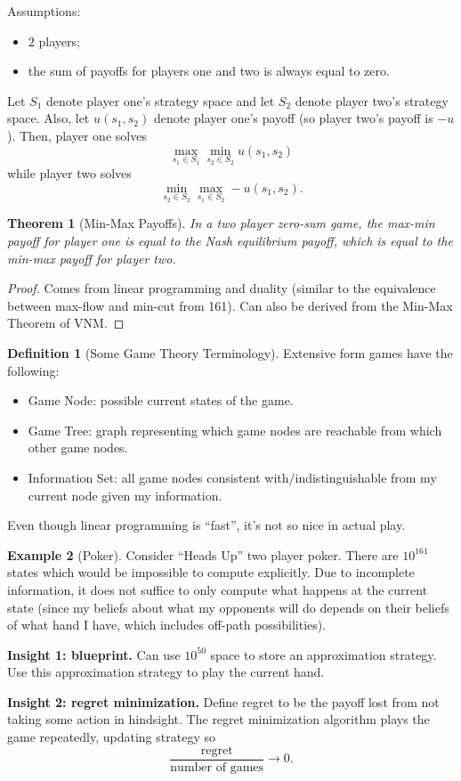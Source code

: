 \documentclass[dvipsnames]{article}
\newtheorem{theorem}{Theorem}[section]
\theoremstyle{definition}
\newtheorem{definition}{Definition}[section]
\newtheorem{example}[definition]{Example}
\theoremstyle{remark}
\begin{document}
Assumptions:
\begin{itemize}
	\item $2$ players; 
	\item the sum of payoffs for players one and two is always equal to zero.
\end{itemize}

Let $S_1$ denote player one's strategy space and let $S_2$ denote player two's strategy space. Also, let $u(s_1,s_2)$ denote player one's payoff (so player two's payoff is $-u$). Then, player one solves
$$\max_{s_1 \in S_1} \min_{s_2 \in S_2} u(s_1,s_2)$$
while player two solves
$$\min_{s_2 \in S_2} \max_{s_1 \in S_2} -u(s_1,s_2).$$

\begin{theorem}[Min-Max Payoffs]
	In a two player zero-sum game, the max-min payoff for player one is equal to the Nash equilibrium payoff, which is equal to the min-max payoff for player two.
\end{theorem}

\begin{proof}
	Comes from linear programming and duality (similar to the equivalence between max-flow and min-cut from 161). Can also be derived from the Min-Max Theorem of VNM.
\end{proof}

\begin{definition}[Some Game Theory Terminology]
	Extensive form games have the following:
	\begin{itemize}
		\item Game Node: possible current states of the game.
		\item Game Tree: graph representing which game nodes are reachable from which other game nodes. 
		\item Information Set: all game nodes consistent with/indistinguishable from my current node given my information.
	\end{itemize}
\end{definition}

Even though linear programming is ``fast'', it's not so nice in actual play.

\begin{example}[Poker]
	Consider ``Heads Up'' two player poker. There are $10^161$ states which would be impossible to compute explicitly. Due to incomplete information, it does not suffice to only compute what happens at the current state (since my beliefs about what my opponents will do depends on their beliefs of what hand I have, which includes off-path possibilities).
	
	\textbf{Insight 1: blueprint.} Can use $10^50$ space to store an approximation strategy. Use this approximation strategy to play the current hand.
	
	\textbf{Insight 2: regret minimization.} Define regret to be the payoff lost from not taking some action in hindsight. The regret minimization algorithm plays the game repeatedly, updating strategy so 
	$$\frac{\text{regret}}{\text{number of games}} \to 0.$$
\end{example}
\end{document}
